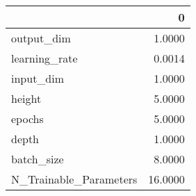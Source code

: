 \begin{tabular}{lr}
\toprule
{} &        0 \\
\midrule
output\_dim             &   1.0000 \\
learning\_rate          &   0.0014 \\
input\_dim              &   1.0000 \\
height                 &   5.0000 \\
epochs                 &   5.0000 \\
depth                  &   1.0000 \\
batch\_size             &   8.0000 \\
N\_Trainable\_Parameters &  16.0000 \\
\bottomrule
\end{tabular}
